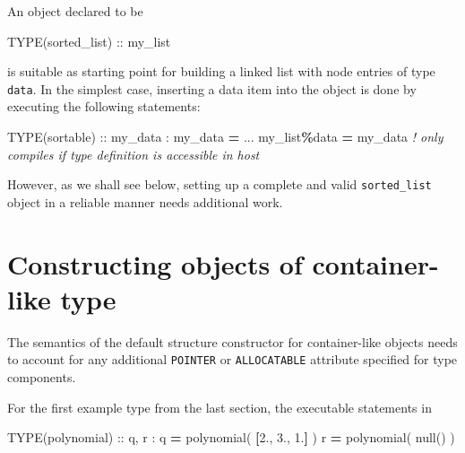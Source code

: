 \documentclass[
  paper=a4,
  ,captions=tableheading
]{scrartcl}
\newenvironment{Shaded}{\begin{snugshade}}{\end{snugshade}}
\newcommand{\CommentTok}[1]{\textcolor[rgb]{0.56,0.35,0.01}{\textit{#1}}}
\newcommand{\DataTypeTok}[1]{\textcolor[rgb]{0.13,0.29,0.53}{#1}}
\newcommand{\FloatTok}[1]{\textcolor[rgb]{0.00,0.00,0.81}{#1}}
\newcommand{\KeywordTok}[1]{\textcolor[rgb]{0.13,0.29,0.53}{\textbf{#1}}}
\newcommand{\NormalTok}[1]{#1}
\newcommand{\OperatorTok}[1]{\textcolor[rgb]{0.81,0.36,0.00}{\textbf{#1}}}
\begin{document}
An object declared to be

\begin{Shaded}
\begin{Highlighting}[]
\DataTypeTok{TYPE(sorted\_list)} \DataTypeTok{::}\NormalTok{ my\_list}
\end{Highlighting}
\end{Shaded}

is suitable as starting point for building a linked list with node
entries of type \texttt{data}. In the simplest case, inserting a data
item into the object is done by executing the following statements:

\begin{Shaded}
\begin{Highlighting}[]
\DataTypeTok{TYPE(sortable)} \DataTypeTok{::}\NormalTok{ my\_data}
\NormalTok{:}
\NormalTok{my\_data }\KeywordTok{=}\NormalTok{ ...}
\NormalTok{my\_list}\OperatorTok{\%}\NormalTok{data }\KeywordTok{=}\NormalTok{ my\_data  }\CommentTok{! only compiles if type definition is accessible in host}
\end{Highlighting}
\end{Shaded}

However, as we shall see below, setting up a complete and valid
\texttt{sorted\_list} object in a reliable manner needs additional work.

\section{Constructing objects of container-like
type}\label{constructing-objects-of-container-like-type}

The semantics of the default structure constructor for container-like
objects needs to account for any additional \texttt{POINTER} or
\texttt{ALLOCATABLE} attribute specified for type components.

For the first example type from the last section, the executable
statements in

\begin{Shaded}
\begin{Highlighting}[]
\DataTypeTok{TYPE(polynomial)} \DataTypeTok{::}\NormalTok{ q, r}
\NormalTok{:}
\NormalTok{q }\KeywordTok{=}\NormalTok{ polynomial( }\KeywordTok{[}\FloatTok{2.}\NormalTok{, }\FloatTok{3.}\NormalTok{, }\FloatTok{1.}\KeywordTok{]}\NormalTok{ )}
\NormalTok{r }\KeywordTok{=}\NormalTok{ polynomial( null() )}
\end{Highlighting}
\end{Shaded}
\end{document}
